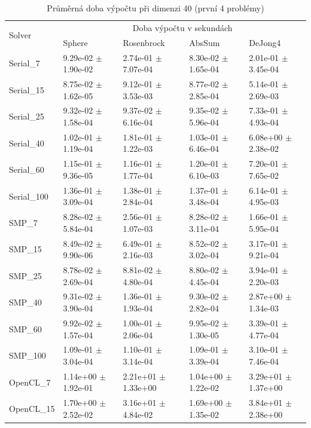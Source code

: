 \documentclass[12pt, a4paper]{report}
\begin{document}
\begin{table}
	\scriptsize
	\caption{Průměrná doba výpočtu při dimenzi 40 (první 4 problémy)}
	\centering
	\label{tbl:time40}
	\begin{tabular}{l|l|l|l|l}
		\multirow{2}{*}{Solver} & \multicolumn{4}{c}{Doba výpočtu v sekundách} \\
		& Sphere & Rosenbrock & AbsSum & DeJong4 \\
		\hline
		\hline
		Serial\_7 & 9.29e-02 $\pm$ 1.90e-02 & 2.74e-01 $\pm$ 7.07e-04 & 8.30e-02 $\pm$ 1.65e-04 & 2.01e-01 $\pm$ 3.45e-04 \\
		Serial\_15 & 8.75e-02 $\pm$ 1.62e-05 & 9.12e-01 $\pm$ 3.53e-03 & 8.77e-02 $\pm$ 2.85e-04 & 5.14e-01 $\pm$ 2.69e-03 \\
		Serial\_25 & 9.32e-02 $\pm$ 1.58e-04 & 9.37e-02 $\pm$ 6.16e-04 & 9.35e-02 $\pm$ 5.96e-04 & 7.33e-01 $\pm$ 4.93e-04 \\
		Serial\_40 & 1.02e-01 $\pm$ 1.19e-04 & 1.81e-01 $\pm$ 1.22e-03 & 1.03e-01 $\pm$ 6.46e-04 & 6.08e+00 $\pm$ 2.38e-02 \\
		Serial\_60 & 1.15e-01 $\pm$ 9.36e-05 & 1.16e-01 $\pm$ 1.77e-04 & 1.20e-01 $\pm$ 6.10e-03 & 7.20e-01 $\pm$ 7.65e-02 \\
		Serial\_100 & 1.36e-01 $\pm$ 3.09e-04 & 1.38e-01 $\pm$ 2.84e-04 & 1.37e-01 $\pm$ 3.48e-04 & 6.14e-01 $\pm$ 4.95e-03 \\
		\hline
		SMP\_7 & 8.28e-02 $\pm$ 5.84e-04 & 2.56e-01 $\pm$ 1.07e-03 & 8.28e-02 $\pm$ 3.11e-04 & 1.66e-01 $\pm$ 5.95e-04 \\
		SMP\_15 & 8.49e-02 $\pm$ 9.90e-06 & 6.49e-01 $\pm$ 2.16e-03 & 8.52e-02 $\pm$ 3.02e-04 & 3.17e-01 $\pm$ 9.21e-04 \\
		SMP\_25 & 8.78e-02 $\pm$ 2.69e-04 & 8.81e-02 $\pm$ 4.80e-04 & 8.80e-02 $\pm$ 4.45e-04 & 3.94e-01 $\pm$ 2.20e-03 \\
		SMP\_40 & 9.31e-02 $\pm$ 3.90e-04 & 1.36e-01 $\pm$ 1.93e-04 & 9.30e-02 $\pm$ 2.82e-04 & 2.87e+00 $\pm$ 1.34e-03 \\
		SMP\_60 & 9.92e-02 $\pm$ 1.57e-04 & 1.00e-01 $\pm$ 2.06e-04 & 9.95e-02 $\pm$ 1.30e-05 & 3.39e-01 $\pm$ 4.77e-04 \\
		SMP\_100 & 1.09e-01 $\pm$ 3.04e-04 & 1.10e-01 $\pm$ 3.14e-04 & 1.09e-01 $\pm$ 3.39e-04 & 3.10e-01 $\pm$ 7.46e-04 \\
		\hline
		OpenCL\_7 & 1.14e+00 $\pm$ 1.92e-01 & 2.21e+01 $\pm$ 1.33e+00 & 1.04e+00 $\pm$ 1.22e-02 & 3.29e+01 $\pm$ 1.37e+00 \\
		OpenCL\_15 & 1.70e+00 $\pm$ 2.52e-02 & 3.16e+01 $\pm$ 4.84e-02 & 1.69e+00 $\pm$ 1.35e-02 & 3.84e+01 $\pm$ 2.38e+00 \\

\end{tabular}
\end{table}
\end{document}
